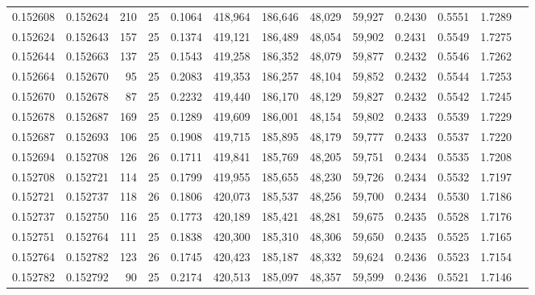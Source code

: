 \begin{tabular}{rrrrrrrrrrrrr}
0.152608 & 0.152624 & 210 &  25 &                                     0.1064 & 418,964 & 186,646 &  48,029 &  59,927 & 0.2430 & 0.5551 & 1.7289 \\
0.152624 & 0.152643 & 157 &  25 &                                     0.1374 & 419,121 & 186,489 &  48,054 &  59,902 & 0.2431 & 0.5549 & 1.7275 \\
0.152644 & 0.152663 & 137 &  25 &                                     0.1543 & 419,258 & 186,352 &  48,079 &  59,877 & 0.2432 & 0.5546 & 1.7262 \\
0.152664 & 0.152670 &  95 &  25 &                                     0.2083 & 419,353 & 186,257 &  48,104 &  59,852 & 0.2432 & 0.5544 & 1.7253 \\
0.152670 & 0.152678 &  87 &  25 &                                     0.2232 & 419,440 & 186,170 &  48,129 &  59,827 & 0.2432 & 0.5542 & 1.7245 \\
0.152678 & 0.152687 & 169 &  25 &                                     0.1289 & 419,609 & 186,001 &  48,154 &  59,802 & 0.2433 & 0.5539 & 1.7229 \\
0.152687 & 0.152693 & 106 &  25 &                                     0.1908 & 419,715 & 185,895 &  48,179 &  59,777 & 0.2433 & 0.5537 & 1.7220 \\
0.152694 & 0.152708 & 126 &  26 &                                     0.1711 & 419,841 & 185,769 &  48,205 &  59,751 & 0.2434 & 0.5535 & 1.7208 \\
0.152708 & 0.152721 & 114 &  25 &                                     0.1799 & 419,955 & 185,655 &  48,230 &  59,726 & 0.2434 & 0.5532 & 1.7197 \\
0.152721 & 0.152737 & 118 &  26 &                                     0.1806 & 420,073 & 185,537 &  48,256 &  59,700 & 0.2434 & 0.5530 & 1.7186 \\
0.152737 & 0.152750 & 116 &  25 &                                     0.1773 & 420,189 & 185,421 &  48,281 &  59,675 & 0.2435 & 0.5528 & 1.7176 \\
0.152751 & 0.152764 & 111 &  25 &                                     0.1838 & 420,300 & 185,310 &  48,306 &  59,650 & 0.2435 & 0.5525 & 1.7165 \\
0.152764 & 0.152782 & 123 &  26 &                                     0.1745 & 420,423 & 185,187 &  48,332 &  59,624 & 0.2436 & 0.5523 & 1.7154 \\
0.152782 & 0.152792 &  90 &  25 &                                     0.2174 & 420,513 & 185,097 &  48,357 &  59,599 & 0.2436 & 0.5521 & 1.7146 \\

\end{tabular}
